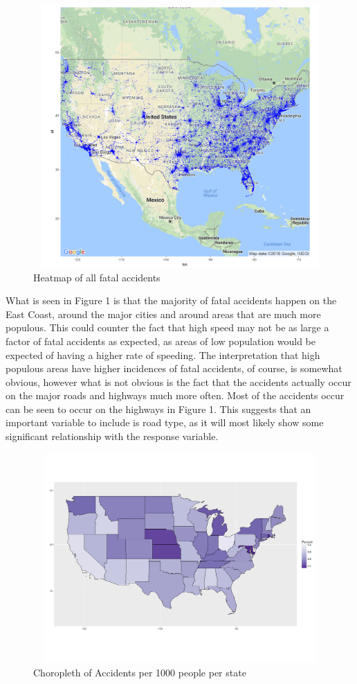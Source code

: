 \documentclass[11pt, oneside,titlepage]{article}   	%
\begin{document}
\begin{figure}[H]
\centering
  \includegraphics[width=15cm,height=10cm,keepaspectratio]{heatmap.png}
\caption{Heatmap of all fatal accidents}
\end{figure}

What is seen in Figure 1 is that the majority of fatal accidents happen on the East Coast, around the major cities and around areas that are much more populous. This could counter the fact that high speed may not be as large a factor of fatal accidents as expected, as areas of low population would be expected of having a higher rate of speeding. The interpretation that high populous areas have higher incidences of fatal accidents, of course, is somewhat obvious, however what is not obvious is the fact that the accidents actually occur on the major roads and highways much more often. Most of the accidents occur can be seen to occur on the highways in Figure 1. This suggests that an important variable to include is road type, as it will most likely show some significant relationship with the response variable.

\begin{figure}[H]
\centering
  \includegraphics[width=15cm,height=8cm,keepaspectratio]{choropleth.png}
\caption{Choropleth of Accidents per 1000 people per state}
\end{figure}
\end{document}
